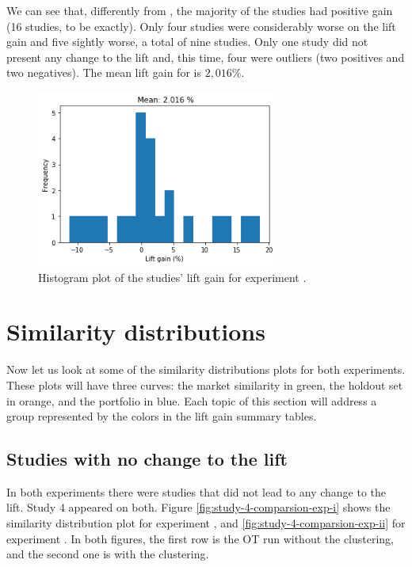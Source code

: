 We can see that, differently from \nameExperimentI{}, the majority of the studies had positive gain (16 studies, to be exactly). Only four studies were considerably worse on the lift gain and five sightly worse, a total of nine studies. Only one study did not present any change to the lift and, this time, four were outliers (two positives and two negatives). The mean lift gain for \nameExperimentII{} is $2,016 \%$.

\begin{figure}[!ht]
   \centering
   \includegraphics[width=8cm]{fig/ch4-lift-hist-plot-exp-ii.png}
   \caption{Histogram plot of the studies' lift gain for experiment \nameExperimentII{}.}
   \label{fig:lift-hist-plot-exp-ii}
\end{figure}

\section{Similarity distributions}
\label{ch:simi-distis}

\newcommand{\simiDistWidth}{8cm}

Now let us look at some of the similarity distributions plots for both experiments. These plots will have three curves: the market similarity in green, the holdout set in orange, and the portfolio in blue. Each topic of this section will address a group represented by the colors in the lift gain summary tables. 

\subsection{Studies with no change to the lift}

In both experiments there were studies that did not lead to any change to the lift. Study 4 appeared on both. Figure \ref{fig:study-4-comparsion-exp-i} shows the similarity distribution plot for experiment \nameExperimentI{}, and \ref{fig:study-4-comparsion-exp-ii} for experiment \nameExperimentII{}. In both figures, the first row is the OT run without the clustering, and the second one is with the clustering. %

